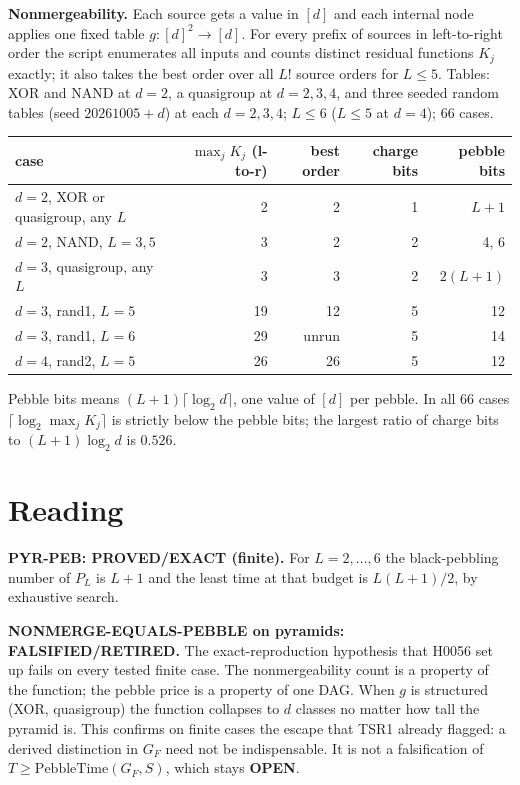 \documentclass[11pt]{article}
\begin{document}
\textbf{Nonmergeability.} Each source gets a value in $[d]$ and each internal node applies one fixed table $g:[d]^2\to[d]$. For every prefix of sources in left-to-right order the script enumerates all inputs and counts distinct residual functions $K_j$ exactly; it also takes the best order over all $L!$ source orders for $L\le5$. Tables: XOR and NAND at $d=2$, a quasigroup at $d=2,3,4$, and three seeded random tables (seed $20261005+d$) at each $d=2,3,4$; $L\le6$ ($L\le5$ at $d=4$); 66 cases.
\begin{center}\begin{tabular}{lrrrr}\toprule
case & $\max_jK_j$ (l-to-r) & best order & charge bits & pebble bits\\\midrule
$d=2$, XOR or quasigroup, any $L$ & 2 & 2 & 1 & $L+1$\\
$d=2$, NAND, $L=3,5$ & 3 & 2 & 2 & 4, 6\\
$d=3$, quasigroup, any $L$ & 3 & 3 & 2 & $2(L+1)$\\
$d=3$, rand1, $L=5$ & 19 & 12 & 5 & 12\\
$d=3$, rand1, $L=6$ & 29 & unrun & 5 & 14\\
$d=4$, rand2, $L=5$ & 26 & 26 & 5 & 12\\\bottomrule
\end{tabular}\end{center}
Pebble bits means $(L+1)\lceil\log_2d\rceil$, one value of $[d]$ per pebble. In all 66 cases $\lceil\log_2\max_jK_j\rceil$ is strictly below the pebble bits; the largest ratio of charge bits to $(L+1)\log_2d$ is $0.526$.

\section*{Reading}
\textbf{PYR-PEB: PROVED/EXACT (finite).} For $L=2,\dots,6$ the black-pebbling number of $P_L$ is $L+1$ and the least time at that budget is $L(L+1)/2$, by exhaustive search.

\textbf{NONMERGE-EQUALS-PEBBLE on pyramids: FALSIFIED/RETIRED.} The exact-reproduction hypothesis that H0056 set up fails on every tested finite case. The nonmergeability count is a property of the function; the pebble price is a property of one DAG. When $g$ is structured (XOR, quasigroup) the function collapses to $d$ classes no matter how tall the pyramid is. This confirms on finite cases the escape that TSR1 already flagged: a derived distinction in $G_F$ need not be indispensable. It is not a falsification of $T\ge\mathrm{PebbleTime}(G_F,S)$, which stays \textbf{OPEN}.
\end{document}
